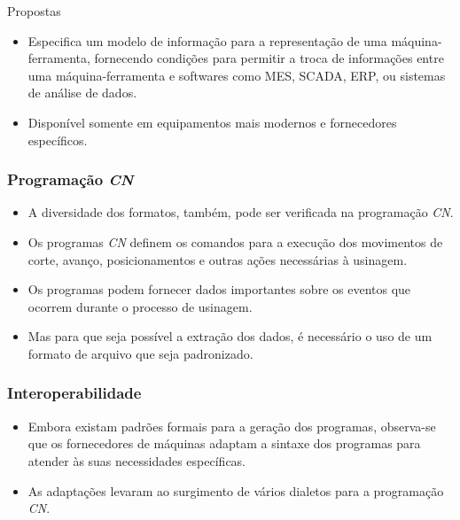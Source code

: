\documentclass[aspectratio=169]{beamer}
\begin{document}
{\begin{frame}{Propostas}
\begin{itemize}
{\begin{itemize}
        \item {
          Especifica um modelo de informação para a representação 
          de uma máquina-ferramenta, fornecendo condições para permitir
          a troca de informa\c c\~oes entre uma máquina-ferramenta e 
          softwares como MES, SCADA, ERP, ou sistemas de análise de dados.
        }
  
        \item {
          Disponível somente em equipamentos mais modernos e fornecedores 
          específicos.
        }
  
      \end{itemize}
    }
    
  \end{itemize}

\end{frame}


\begin{frame}
  \frametitle{Programação \emph{CN}}

\begin{itemize}
  \item A diversidade dos formatos, tamb\'em, pode ser verificada na 
        programa\c c\~ao \emph{CN}.
  \item Os programas \emph{CN} definem os comandos para a execução dos 
        movimentos de corte, avanço, posicionamentos e outras ações 
        necessárias à usinagem.
  \item Os programas podem fornecer dados importantes sobre os 
        eventos que ocorrem durante o processo de usinagem.
  \item Mas para que seja possível a extração dos dados, é necessário 
        o uso de um formato de arquivo que seja padronizado.
\end{itemize}  

\end{frame}


\begin{frame}
  \frametitle{Interoperabilidade}

  \begin{itemize}
    \item {
        Embora existam padr\~oes formais para a gera\c c\~ao dos 
        programas, observa-se que os fornecedores de m\'aquinas 
        adaptam a sintaxe dos programas para atender \`as suas 
        necessidades espec\'ificas.
    }

    \item {
      As adaptações levaram ao surgimento de vários dialetos 
      para a programação \emph{CN}.
    }
     

\end{itemize}
\end{frame}}
\end{document}
